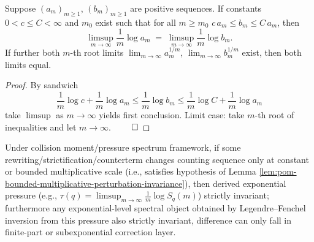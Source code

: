 \begin{lemma}\label{lem:pom-bounded-multiplicative-perturbation-invariance}
Suppose \((a_m)_{m\ge 1}\), \((b_m)_{m\ge 1}\) are positive sequences.
If constants \(0<c\le C<\infty\) and \(m_0\) exist such that for all \(m\ge m_0\)
\(
c\,a_m\le b_m\le C\,a_m
\),
then
\[
\limsup_{m\to\infty}\frac{1}{m}\log a_m
\;=\;
\limsup_{m\to\infty}\frac{1}{m}\log b_m.
\]
If further both \(m\)-th root limits \(\lim_{m\to\infty}a_m^{1/m}\), \(\lim_{m\to\infty}b_m^{1/m}\) exist, then both limits equal.
\end{lemma}
\begin{proof}
By sandwich
\[
\frac{1}{m}\log c+\frac{1}{m}\log a_m
\le
\frac{1}{m}\log b_m
\le
\frac{1}{m}\log C+\frac{1}{m}\log a_m

\]
take \(\limsup\) as \(m\to\infty\) yields first conclusion.
Limit case: take \(m\)-th root of inequalities and let \(m\to\infty\). $\qed$
\end{proof}

\begin{corollary}\label{cor:pom-pressure-stability-under-bounded-perturbation}
Under collision moment/pressure spectrum framework, if some rewriting/strictification/counterterm changes counting sequence only at constant or bounded multiplicative scale (i.e., satisfies hypothesis of Lemma \ref{lem:pom-bounded-multiplicative-perturbation-invariance}),
then derived exponential pressure (e.g., \(\tau(q)=\limsup_{m\to\infty}\frac{1}{m}\log S_q(m)\)) strictly invariant;
furthermore any exponential-level spectral object obtained by Legendre--Fenchel inversion from this pressure also strictly invariant, difference can only fall in finite-part or subexponential correction layer.
\end{corollary}
